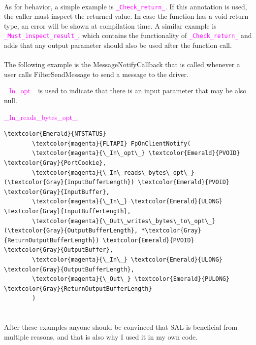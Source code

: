 		\paragraph{}
		As for behavior, a simple example is \textcolor{magenta}{\texttt{\_Check\_return\_}}. If this annotation is used, the caller must inspect the returned value. In case the function has a void return type, an error will be shown at compilation time. A similar example is \textcolor{magenta}{\texttt{\_Must\_inspect\_result\_}}, which contains the functionality of \textcolor{magenta}{\texttt{\_Check\_return\_}} and adds that any output parameter should also be used after the function call.
		
		\paragraph{}
		The following example is the MessageNotifyCallback that is called whenever a user calls FilterSendMessage to send a message to the driver. 
		
		\textcolor{magenta}{\_In\_opt\_} is used to indicate that there is an input parameter that may be also null.
		
		\textcolor{magenta}{\_In\_reads\_bytes\_opt\_}
		
		
		\begin{Verbatim}[fontsize=\small, commandchars=\\\{\}]
		\textcolor{Emerald}{NTSTATUS}
		\textcolor{magenta}{FLTAPI} FpOnClientNotify(
		\textcolor{magenta}{\_In\_opt\_} \textcolor{Emerald}{PVOID} \textcolor{Gray}{PortCookie},
		\textcolor{magenta}{\_In\_reads\_bytes\_opt\_}(\textcolor{Gray}{InputBufferLength}) \textcolor{Emerald}{PVOID} \textcolor{Gray}{InputBuffer},
		\textcolor{magenta}{\_In\_} \textcolor{Emerald}{ULONG} \textcolor{Gray}{InputBufferLength},
		\textcolor{magenta}{\_Out\_writes\_bytes\_to\_opt\_}(\textcolor{Gray}{OutputBufferLength}, *\textcolor{Gray}{ReturnOutputBufferLength}) \textcolor{Emerald}{PVOID} \textcolor{Gray}{OutputBuffer},
		\textcolor{magenta}{\_In\_} \textcolor{Emerald}{ULONG} \textcolor{Gray}{OutputBufferLength},
		\textcolor{magenta}{\_Out\_} \textcolor{Emerald}{PULONG} \textcolor{Gray}{ReturnOutputBufferLength}
		)
		
		\end{Verbatim}
		
		
		\paragraph{}
		After these examples anyone should be convinced that SAL is beneficial from multiple reasons, and that is also why I used it in my own code.
	
